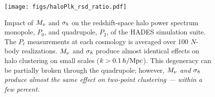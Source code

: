 \begin{figure}
\begin{center}
\texttt{[image: figs/haloPlk\_rsd\_ratio.pdf]}
    \caption{Impact of $M_\nu$ and $\sigma_8$ on the redshift-space halo power 
    spectrum monopole, $P_0$, and quadrupole, $P_2$, of the HADES simulation 
    suite. The $P_\ell$ measurements at each cosmology is
    averaged over 100 $N$-body realizations. $M_\nu$ and $\sigma_8$ produce 
    almost identical effects on halo clustering on small scales 
    ($k > 0.1\,h/\mathrm{Mpc}$). This degeneracy can be partially broken through 
    the quadrupole; however, {\em $M_\nu$ and $\sigma_8$ produce almost 
    the same effect on two-point clustering --- within a few percent}.
    }
\label{fig:plk}
\end{center}
\end{figure}


